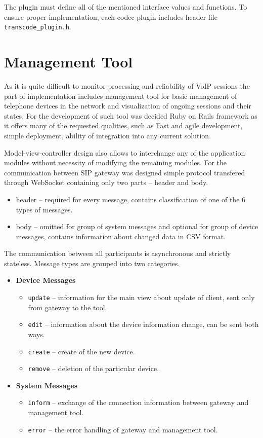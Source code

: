 The plugin must define all of the mentioned interface values and functions.
To ensure proper implementation, each codec plugin includes header file 
\texttt{transcode\_plugin.h}.


\section{Management Tool}
As it is quite difficult to monitor processing and reliability of VoIP sessions
the part of implementation includes management tool for basic management of 
telephone devices in the network and visualization of ongoing sessions and 
their states. For the development of such tool was decided Ruby on Rails 
framework as it offers many of the requested qualities, such as Fast and agile 
development, simple deployment, ability of integration into any current 
solution. 

Model-view-controller design also allows to interchange any of the application
modules without necessity of modifying the remaining modules. For the
communication between SIP gateway was designed simple protocol transfered
through WebSocket containing only two parts -- header and body.

\begin{itemize}
\item header -- required for every message, contains classification of one of 
the 6 types of messages.
\item body -- omitted for group of system messages and optional for group of 
device messages, contains information about changed data in CSV format.
\end{itemize}   

The communication between all participants is asynchronous and strictly 
stateless. Message types are grouped into two categories.

\begin{itemize}
\item \textbf{Device Messages}
\begin{itemize}
\item \texttt{update} -- information for the main view about update of client, 
sent only from gateway to the tool.
\item \texttt{edit} -- information about the device information change, can be 
sent both ways.
\item \texttt{create} -- create of the new device.
\item \texttt{remove} -- deletion of the particular device.
\end{itemize}

\item \textbf{System Messages}
\begin{itemize}
\item \texttt{inform} -- exchange of the connection information between gateway and management tool.
\item \texttt{error} -- the error handling of gateway and management tool.
\end{itemize}
\end{itemize}

